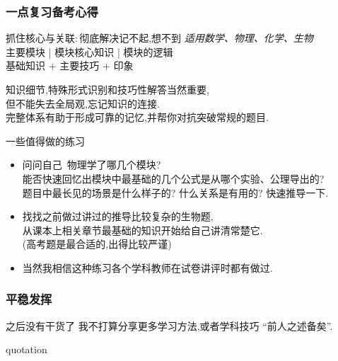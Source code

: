 \documentclass[10pt]{beamer}
\begin{document}
\begin{frame}
	\frametitle{一点复习备考心得}
	\begin{block}{抓住核心与关联:\,彻底解决记不起,想不到}
		\emph{\tiny{适用数学、物理、化学、生物}}\\
		主要模块 |  模块核心知识 | 模块的逻辑\\
		基础知识 + 主要技巧 + 印象\\
	\end{block}

	知识细节,特殊形式识别和技巧性解答当然重要,\\
	但不能失去全局观,忘记知识的连接.\\
	完整体系有助于形成可靠的记忆,并帮你对抗突破常规的题目.\\

	\pause{}

	\begin{example}{一些值得做的练习}
		\begin{itemize}
			\item 问问自己\ 物理学了哪几个模块?\\
				能否快速回忆出模块中最基础的几个公式是从哪个实验、公理导出的?\\
				题目中最长见的场景是什么样子的? 什么关系是有用的? 快速推导一下.\\
			\item 找找之前做过讲过的推导比较复杂的生物题,\\ 从课本上相关章节最基础的知识开始给自己讲清常楚它.\\
				(高考题是最合适的,出得比较严谨)
			\item 当然我相信这种练习各个学科教师在试卷讲评时都有做过.
		\end{itemize}
	\end{example}
\end{frame}


\begin{frame}
	\frametitle{平稳发挥}
	\begin{alertblock}{之后没有干货了}
		我不打算分享更多学习方法,或者学科技巧\quad
		``前人之述备矣''.
	\end{alertblock}
	\begin{block}{quotation}
		\\
		\\
		{\ }
		\\
	\end{block}
\end{frame}
\end{document}
